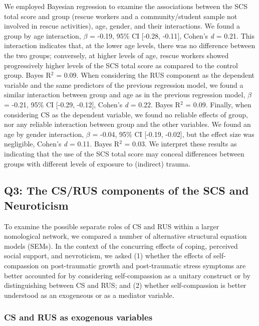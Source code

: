 \documentclass[
  english,
  man,floatsintext]{apa7}
\begin{document}
We employed Bayesian regression to examine the associations between the SCS total score and group (rescue workers and a community/student sample not involved in rescue activities), age, gender, and their interactions. We found a group by age interaction, \(\beta\) = -0.19, 95\% CI {[}-0.28, -0.11{]}, Cohen's \emph{d} = 0.21. This interaction indicates that, at the lower age levels, there was no difference between the two groups; conversely, at higher levels of age, rescue workers showed progressively higher levels of the SCS total score as compared to the control group. Bayes R\(^2\) = 0.09. When considering the RUS component as the dependent variable and the same predictors of the previous regression model, we found a similar interaction between group and age as in the previous regression model, \(\beta\) = -0.21, 95\% CI {[}-0.29, -0.12{]}, Cohen's \emph{d} = 0.22. Bayes R\(^2\) = 0.09.
Finally, when considering CS as the dependent variable, we found no reliable effects of group, nor any reliable interaction between group and the other variables. We found an age by gender interaction, \(\beta\) = -0.04, 95\% CI {[}-0.19, -0.02{]}, but the effect size was negligible, Cohen's \emph{d} = 0.11. Bayes R\(^2\) = 0.03.
We interpret these results as indicating that the use of the SCS total score may conceal differences between groups with different levels of exposure to (indirect) trauma.

\hypertarget{q3-the-csrus-components-of-the-scs-and-neuroticism}{%
\subsection{Q3: The CS/RUS components of the SCS and Neuroticism}\label{q3-the-csrus-components-of-the-scs-and-neuroticism}}

To examine the possible separate roles of CS and RUS within a larger nomological network, we compared a number of alternative structural equation models (SEMs). In the context of the concurring effects of coping, perceived social support, and nevroticism, we asked (1) whether the effects of self-compassion on post-traumatic growth and post-traumatic stress symptoms are better accounted for by considering self-compassion as a unitary construct or by distinguishing between CS and RUS; and (2) whether self-compassion is better understood as an exogeneous or as a mediator variable.

\hypertarget{cs-and-rus-as-exogenous-variables}{%
\subsubsection{CS and RUS as exogenous variables}\label{cs-and-rus-as-exogenous-variables}}
\end{document}
